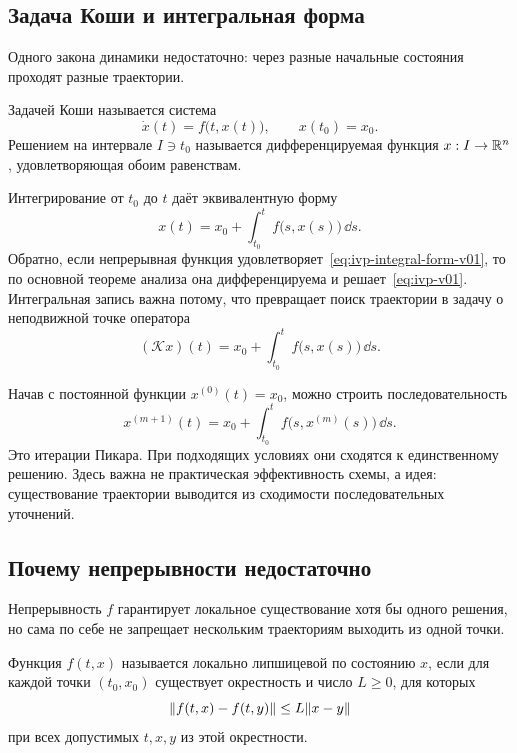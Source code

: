 \subsection{Задача Коши и интегральная форма}

Одного закона динамики недостаточно: через разные начальные состояния проходят разные траектории.

\begin{definition}
Задачей Коши называется система
\begin{equation}
\label{eq:ivp-v01}
\dot x(t)=f\bigl(t,x(t)\bigr),
\qquad
x(t_0)=x_0.
\end{equation}
Решением на интервале $I\ni t_0$ называется дифференцируемая функция $x:I\to\mathbb{R}^n$, удовлетворяющая обоим равенствам.
\end{definition}

Интегрирование от $t_0$ до $t$ даёт эквивалентную форму
\begin{equation}
\label{eq:ivp-integral-form-v01}
x(t)
=
x_0+
\int_{t_0}^{t}
f\bigl(s,x(s)\bigr)\,\dd s.
\end{equation}
Обратно, если непрерывная функция удовлетворяет~\eqref{eq:ivp-integral-form-v01}, то по основной теореме анализа она дифференцируема и решает~\eqref{eq:ivp-v01}. Интегральная запись важна потому, что превращает поиск траектории в задачу о неподвижной точке оператора
\[
(\mathcal Kx)(t)
=
x_0+
\int_{t_0}^{t}f\bigl(s,x(s)\bigr)\,\dd s.
\]

Начав с постоянной функции $x^{(0)}(t)=x_0$, можно строить последовательность
\begin{equation}
\label{eq:picard-iteration-v01}
x^{(m+1)}(t)
=
x_0+
\int_{t_0}^{t}
f\bigl(s,x^{(m)}(s)\bigr)\,\dd s.
\end{equation}
Это итерации Пикара. При подходящих условиях они сходятся к единственному решению. Здесь важна не практическая эффективность схемы, а идея: существование траектории выводится из сходимости последовательных уточнений.

\subsection{Почему непрерывности недостаточно}

Непрерывность $f$ гарантирует локальное существование хотя бы одного решения, но сама по себе не запрещает нескольким траекториям выходить из одной точки.

\begin{definition}
Функция $f(t,x)$ называется локально липшицевой по состоянию $x$, если для каждой точки $(t_0,x_0)$ существует окрестность и число $L\geq0$, для которых
\begin{equation}
\label{eq:local-lipschitz-v01}
\lVert f(t,x)-f(t,y)\rVert
\leq
L\lVert x-y\rVert
\end{equation}
при всех допустимых $t,x,y$ из этой окрестности.
\end{definition}

